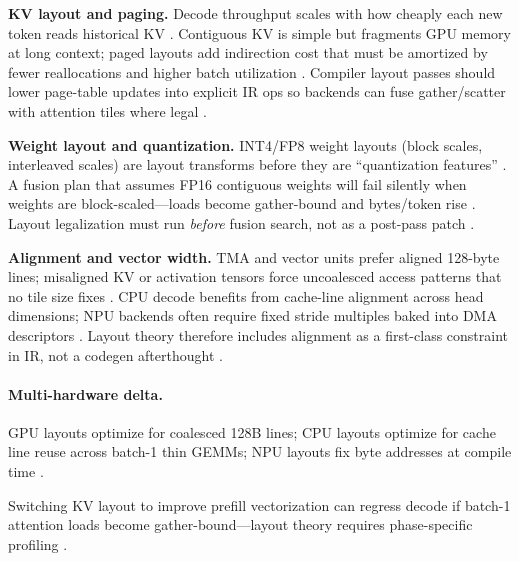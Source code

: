 \textbf{KV layout and paging.} Decode throughput scales with how cheaply each new token reads historical KV \citep{kwon2023vllm,dao2023flashdecoding,patel2025llminference}. Contiguous KV is simple but fragments GPU memory at long context; paged layouts add indirection cost that must be amortized by fewer reallocations and higher batch utilization \citep{kwon2023vllm,taxbreak2026}. Compiler layout passes should lower page-table updates into explicit IR ops so backends can fuse gather/scatter with attention tiles where legal \citep{yirage2026,chen2020compilerbasedhardw}.

\textbf{Weight layout and quantization.} INT4/FP8 weight layouts (block scales, interleaved scales) are layout transforms before they are ``quantization features'' \citep{liu2024deepseekv3,patel2025llminference,semianalysis2024tma}. A fusion plan that assumes FP16 contiguous weights will fail silently when weights are block-scaled---loads become gather-bound and bytes/token rise \citep{memoryfloor2026,yirage2026}. Layout legalization must run \emph{before} fusion search, not as a post-pass patch \citep{chen2020compilerbasedhardw,yirage2026,taxbreak2026}.

\textbf{Alignment and vector width.} TMA and vector units prefer aligned 128-byte lines; misaligned KV or activation tensors force uncoalesced access patterns that no tile size fixes \citep{semianalysis2024tma,nvidia2022hopper,dlbook}. CPU decode benefits from cache-line alignment across head dimensions; NPU backends often require fixed stride multiples baked into DMA descriptors \citep{amd2024xdna,amd2024aie,chen2020compilerbasedhardw}. Layout theory therefore includes alignment as a first-class constraint in IR, not a codegen afterthought \citep{yirage2026,patel2025llminference}.

\paragraph{Multi-hardware delta.} GPU layouts optimize for coalesced 128B lines; CPU layouts optimize for cache line reuse across batch-1 thin GEMMs; NPU layouts fix byte addresses at compile time \citep{nvidia2022hopper,amd2024xdna,dlbook,patel2025llminference,kwon2023vllm,yirage2026,chen2020compilerbasedhardw,taxbreak2026,memoryfloor2026,semianalysis2024tma,liu2024deepseekv3,dao2022flashattention,dao2023flashdecoding,nvidia2024cudagraphs,amd2024aie}.

\begin{example}
Switching KV layout to improve prefill vectorization can regress decode if batch-1 attention loads become gather-bound---layout theory requires phase-specific profiling \citep{kwon2023vllm,dao2023flashdecoding,patel2025llminference,taxbreak2026,memoryfloor2026,yirage2026,chen2020compilerbasedhardw,amd2024xdna,semianalysis2024tma,dlbook,liu2024deepseekv3,dao2022flashattention,nvidia2022hopper,nvidia2024cudagraphs,amd2024aie}.
\end{example}

